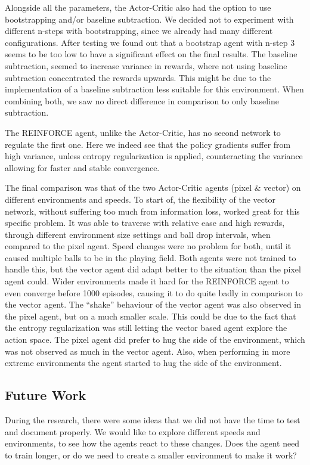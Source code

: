 \documentclass{article}
\begin{document}
Alongside all the parameters, the Actor-Critic also had the option to use bootstrapping and/or baseline subtraction. 
We decided not to experiment with different n-steps with bootstrapping, since we already had many different configurations.
After testing we found out that a bootstrap agent with n-step 3 seems to be too low to have a significant effect on the final results. 
The baseline subtraction, seemed to increase variance in rewards, where not using baseline subtraction concentrated the rewards upwards. 
This might be due to the implementation of a baseline subtraction less suitable for this environment. 
When combining both, we saw no direct difference in comparison to only baseline subtraction. 

The REINFORCE agent, unlike the Actor-Critic, has no second network to regulate the first one. 
Here we indeed see that the policy gradients suffer from high variance, unless entropy regularization is applied, counteracting the variance allowing for faster and stable convergence. 

The final comparison was that of the two Actor-Critic agents (pixel \& vector) on different environments and speeds.
To start of, the flexibility of the vector network, without suffering too much from information loss, worked great for this specific problem. 
It was able to traverse with relative ease and high rewards, through different environment size settings and ball drop intervals, when compared to the pixel agent.
Speed changes were no problem for both, until it caused multiple balls to be in the playing field. 
Both agents were not trained to handle this, but the vector agent did adapt better to the situation than the pixel agent could. 
Wider environments made it hard for the REINFORCE agent to even converge before 1000 episodes, causing it to do quite badly in comparison to the vector agent.
The ``shake'' behaviour of the vector agent was also observed in the pixel agent, but on a much smaller scale.
This could be due to the fact that the entropy regularization was still letting the vector based agent explore the action space.  
The pixel agent did prefer to hug the side of the environment, which was not observed as much in the vector agent.
Also, when performing in more extreme environments the agent started to hug the side of the environment. 

\subsection{Future Work}
During the research, there were some ideas that we did not have the time to test and document properly.
We would like to explore different speeds and environments, to see how the agents react to these changes.
Does the agent need to train longer, or do we need to create a smaller environment to make it work?
\end{document}
